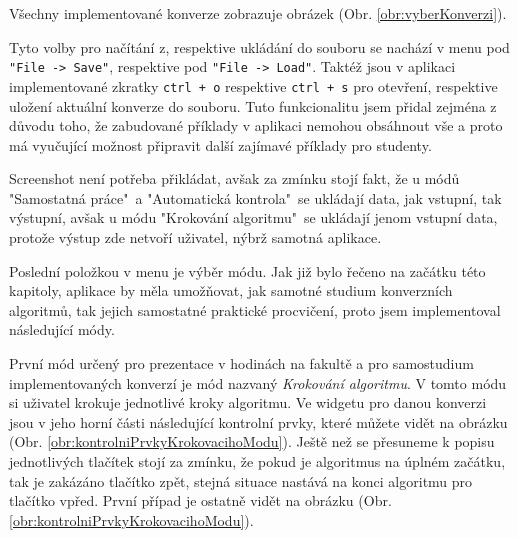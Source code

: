 Všechny implementované konverze zobrazuje obrázek (Obr. \ref{obr:vyberKonverzi}).




Tyto volby pro načítání z, respektive ukládání do souboru se nachází v menu pod \texttt{"File -> Save"}, respektive pod \texttt{"File -> Load"}. Taktéž jsou v aplikaci implementované zkratky \texttt{ctrl + o} respektive \texttt{ctrl + s} pro otevření, respektive uložení aktuální konverze do souboru. Tuto funkcionalitu jsem přidal zejména z důvodu toho, že zabudované příklady v aplikaci nemohou obsáhnout vše a proto má vyučující možnost připravit další zajímavé příklady pro studenty.  

Screenshot není potřeba přikládat, avšak za zmínku stojí fakt, že u módů "Samostatná práce"\ a "Automatická kontrola"\ se ukládají data, jak vstupní, tak výstupní, avšak u módu "Krokování algoritmu"\ se ukládají jenom vstupní data, protože výstup zde netvoří uživatel, nýbrž samotná aplikace.


Poslední položkou v menu je výběr módu. Jak již bylo řečeno na začátku této kapitoly, aplikace by měla umožňovat, jak samotné studium konverzních algoritmů, tak jejich samostatné praktické procvičení, proto jsem implementoval následující módy.


První mód určený pro prezentace v hodinách na fakultě a pro samostudium implementovaných konverzí je mód nazvaný \textit{Krokování algoritmu}. V tomto módu si uživatel krokuje jednotlivé kroky algoritmu. Ve widgetu pro danou konverzi jsou v jeho horní části následující kontrolní prvky, které můžete vidět na obrázku (Obr. \ref{obr:kontrolniPrvkyKrokovacihoModu}). Ještě než se přesuneme k popisu jednotlivých tlačítek stojí za zmínku, že pokud je algoritmus na úplném začátku, tak je zakázáno tlačítko zpět, stejná situace nastává na konci algoritmu pro tlačítko vpřed. První případ je ostatně vidět na obrázku (Obr. \ref{obr:kontrolniPrvkyKrokovacihoModu}).


